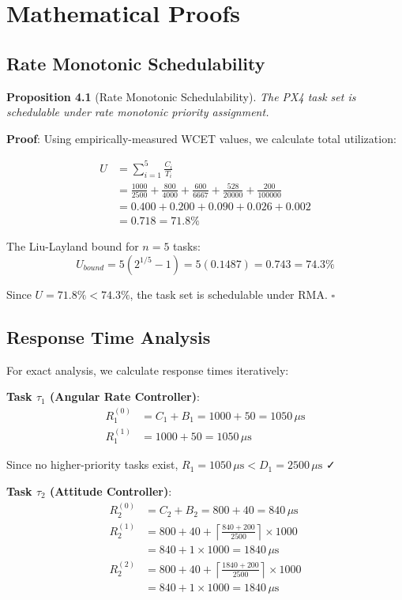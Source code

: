 \documentclass[11pt,a4paper]{article}
\theoremstyle{definition}
\theoremstyle{remark}
\begin{document}
\section{Mathematical Proofs}

\subsection{Rate Monotonic Schedulability}

\textbf{Proposition 4.1} (Rate Monotonic Schedulability). \textit{The PX4 task set is schedulable under rate monotonic priority assignment.}

\textbf{Proof}: Using empirically-measured WCET values, we calculate total utilization:

\begin{align}
U &= \sum_{i=1}^{5} \frac{C_i}{T_i} \\
&= \frac{1000}{2500} + \frac{800}{4000} + \frac{600}{6667} + \frac{528}{20000} + \frac{200}{100000} \\
&= 0.400 + 0.200 + 0.090 + 0.026 + 0.002 \\
&= 0.718 = 71.8\%
\end{align}

The Liu-Layland bound for $n=5$ tasks:
\begin{equation}
U_{bound} = 5(2^{1/5} - 1) = 5(0.1487) = 0.743 = 74.3\%
\end{equation}

Since $U = 71.8\% < 74.3\%$, the task set is schedulable under RMA. $\square$

\subsection{Response Time Analysis}

For exact analysis, we calculate response times iteratively:

\textbf{Task $\tau_1$ (Angular Rate Controller)}:
\begin{align}
R_1^{(0)} &= C_1 + B_1 = 1000 + 50 = 1050\,\mu\text{s} \\
R_1^{(1)} &= 1000 + 50 = 1050\,\mu\text{s}
\end{align}

Since no higher-priority tasks exist, $R_1 = 1050\,\mu\text{s} < D_1 = 2500\,\mu\text{s}$ ✓

\textbf{Task $\tau_2$ (Attitude Controller)}:
\begin{align}
R_2^{(0)} &= C_2 + B_2 = 800 + 40 = 840\,\mu\text{s} \\
R_2^{(1)} &= 800 + 40 + \left\lceil \frac{840 + 200}{2500} \right\rceil \times 1000 \\
&= 840 + 1 \times 1000 = 1840\,\mu\text{s} \\
R_2^{(2)} &= 800 + 40 + \left\lceil \frac{1840 + 200}{2500} \right\rceil \times 1000 \\
&= 840 + 1 \times 1000 = 1840\,\mu\text{s}
\end{align}
\end{document}
